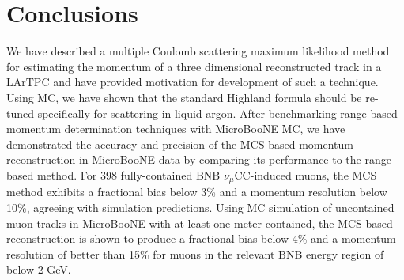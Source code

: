 \documentclass[a4paper,11pt]{article}
\begin{document}
\section{Conclusions}
We have described a multiple Coulomb scattering maximum likelihood method for estimating the momentum of a three dimensional reconstructed track in a LArTPC and have provided motivation for development of such a technique. Using MC, we have shown that the standard Highland formula should be re-tuned specifically for scattering in liquid argon. After benchmarking range-based momentum determination techniques with MicroBooNE MC, we have demonstrated the accuracy and precision of the MCS-based momentum reconstruction in MicroBooNE data by comparing its performance to the range-based method. For 398 fully-contained BNB $\nu_\mu$CC-induced muons, the MCS method exhibits a fractional bias below 3\% and a momentum resolution below 10\%, agreeing with simulation predictions. Using MC simulation of uncontained muon tracks in MicroBooNE with at least one meter contained, the MCS-based reconstruction is shown to produce a fractional bias below 4\% and a momentum resolution of better than 15\% for muons in the relevant BNB energy region of below 2 GeV.
\end{document}
